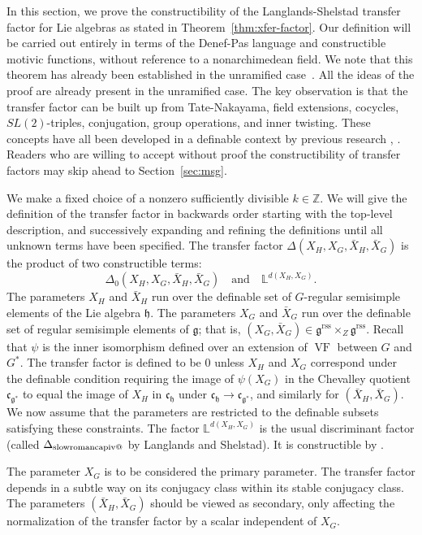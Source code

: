 \documentclass[12pt]{amsart}
\makeatletter
\newcommand*{\rom}[1]{\text{\expandafter\@slowromancap\romannumeral #1@}}
\newcommand{\op}[1]{\operatorname{#1}}
\newcommand{\ring}[1]{{\mathbb #1}}
\def\VF{{\op{VF}}}
\newcommand{\fg}{\mathfrak{g}}
\newcommand{\fc}{\mathfrak{c}}
\newcommand{\fh}{\mathfrak{h}}
\newcommand{\reg}{\mathrm{rss}}
\theoremstyle{plain}
\theoremstyle{definition}
\makeatother
\begin{document}
In this section, we prove the constructibility of the
Langlands-Shelstad transfer factor for Lie algebras as stated in
Theorem~\ref{thm:xfer-factor}.  Our definition will be carried out
entirely in terms of the Denef-Pas language and constructible motivic
functions, without reference to a nonarchimedean field.  We note that
this theorem has already been established in the unramified
case~\cite{CHL}.  All the ideas of the proof are already present in
the unramified case.  The key observation is that the transfer factor
can be built up from Tate-Nakayama, field extensions, cocycles,
$SL(2)$-triples, conjugation, group operations, and inner twisting.
These concepts have all been developed in a definable context by
previous research \cite{CHL}, \cite{CGH}.  Readers who are willing to
accept without proof the constructibility of transfer factors may skip ahead to
Section~\ref{sec:msg}.


We make a fixed choice of a nonzero sufficiently divisible
$k\in\ring{Z}$.  We will give the definition of the transfer factor in
backwards order starting with the top-level description, and
successively expanding and refining the definitions until all unknown
terms have been specified.  The transfer factor $\Delta(X_H,X_G,\bar
X_H,\bar X_G)$ is the product of two constructible terms:
\[
\Delta_0(X_H,X_G,\bar
X_H,\bar X_G)\quad\text{and}\quad \ring{L}^{d(X_H,X_G)}.
\]
The parameters $X_H$ and $\bar X_H$ run over the definable set of
$G$-regular semisimple elements of the Lie algebra $\fh$.  The
parameters $X_G$ and $\bar X_G$ run over the definable set of regular
semisimple elements of $\fg$; that is, $(X_G,\bar X_G)\in
\fg^\reg\times_Z\fg^\reg$.  Recall that $\psi$ is the inner isomorphism
defined over an extension of $\VF$ between $G$ and $G^*$.  The
transfer factor is defined to be $0$ unless $X_H$ and $X_G$ correspond
under the definable condition requiring the image of $\psi(X_G)$ in
the Chevalley quotient $\fc_{\fg^*}$ to equal the image of $X_H$ in
$\fc_{\fh}$ under $\fc_{\fh}\to\fc_{\fg^*}$, and similarly for $(\bar
X_H,\bar X_G)$.  We now assume that the parameters are restricted to
the definable subsets satisfying these constraints.  The factor
$\ring{L}^{d(X_H,X_G)}$ is the usual discriminant factor (called
$\Delta_{\rom4}$ by Langlands and Shelstad).  It is constructible by
\cite{CHL}.

The parameter $X_G$ is to be considered the primary parameter.  The
transfer factor depends in a subtle way on its conjugacy class within
its stable conjugacy class. The parameters $(\bar X_H,\bar X_G)$
should be viewed as secondary, only affecting the normalization of the
transfer factor by a scalar independent of $X_G$.
\end{document}
